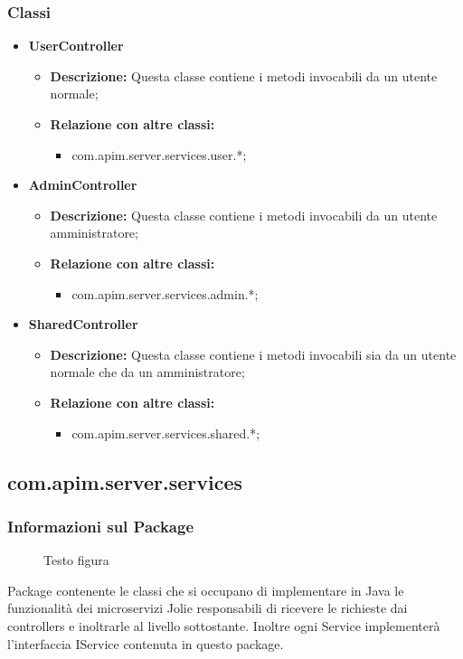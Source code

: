 {{        \subsubsection{Classi}
        \begin{itemize} \itemsep1pt
        \item \textbf{UserController}
        \begin{itemize}
        \item \textbf{Descrizione:} Questa classe contiene i metodi invocabili da un utente normale;
        \item \textbf{Relazione con altre classi:}
        \begin{itemize}
        \item com.apim.server.services.user.*;
        \end{itemize}
        \end{itemize}
        \item \textbf{AdminController}
        \begin{itemize}
        \item \textbf{Descrizione:} Questa classe contiene i metodi invocabili da un utente amministratore;
        \item \textbf{Relazione con altre classi:}
        \begin{itemize}
        \item com.apim.server.services.admin.*;
        \end{itemize}
        \end{itemize}
        \item \textbf{SharedController}
        \begin{itemize}
        \item \textbf{Descrizione:} Questa classe contiene i metodi invocabili sia da un utente normale che da un amministratore;
        \item \textbf{Relazione con altre classi:}
        \begin{itemize}
        \item com.apim.server.services.shared.*;
        \end{itemize}
        \end{itemize}
        \end{itemize}
  }
  \subsection{com.apim.server.services}{
    \subsubsection{Informazioni sul Package}
     \begin{figure}[ht]
       \centering
       \caption{Testo figura}
       \label{Testo figura}
     \end{figure}
     Package contenente le classi che si occupano di implementare in Java le funzionalità dei microservizi Jolie responsabili di ricevere le richieste dai controllers e inoltrarle al livello sottostante. Inoltre ogni Service implementerà l'interfaccia IService contenuta in questo package.
}}
